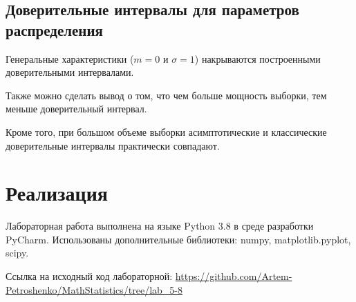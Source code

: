 \documentclass[12pt]{article}
\begin{document}
	\subsection{Доверительные интервалы для параметров распределения}
	
	Генеральные характеристики ($m = 0$ и $\sigma = 1$) накрываются построенными доверительными интервалами.
	
	Также можно сделать вывод о том, что чем больше мощность выборки, тем меньше доверительный интервал.
	
	Кроме того, при большом объеме выборки асимптотические и классические доверительные интервалы практически совпадают.
	
	\section{Реализация}
	
	Лабораторная работа выполнена на языке Python 3.8 в среде разработки PyCharm. Использованы дополнительные библиотеки: numpy, matplotlib.pyplot, scipy.
	
	Ссылка на исходный код лабораторной: \url{https://github.com/Artem-Petroshenko/MathStatistics/tree/lab_5-8}
	
\end{document}
